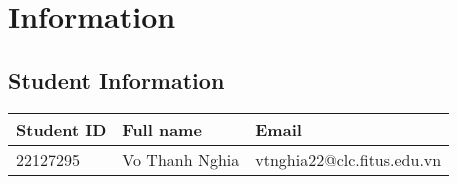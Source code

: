 \section{Information}
\subsection{Student Information}
\renewcommand{\arraystretch}{2}

\begin{center}
\begin{tabular}{|>{\centering\arraybackslash}m{4cm}|>{\centering\arraybackslash}m{5cm}|>{\centering\arraybackslash}m{7cm}|}
  \hline
  \textbf{\Large Student ID} & \textbf{\Large Full name} & \textbf{\Large Email} \\
  \hline
  \Large 22127295 & \Large Vo Thanh Nghia & \Large vtnghia22@clc.fitus.edu.vn \\
  \hline
\end{tabular}
\end{center}



